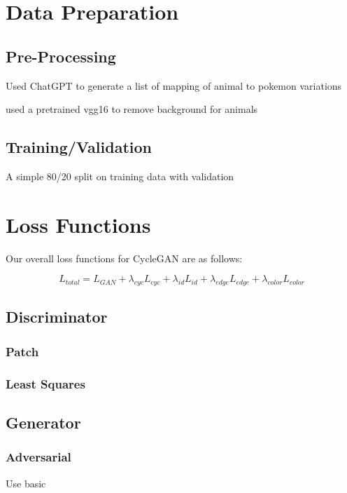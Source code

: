 \documentclass[twoside,english,notitlepage]{report}
\begin{document}
\section{Data Preparation}
\subsection{Pre-Processing}
Used ChatGPT to generate a list of mapping of animal to pokemon variations


used a pretrained vgg16 to remove background for animals



\subsection{Training/Validation}
A simple 80/20 split on training data with validation



\section{Loss Functions}
Our overall loss functions for CycleGAN are as follows:


\begin{equation}
    L_{total} = L_{GAN} + \lambda_{cyc} L_{cyc} + \lambda_{id} L_{id} + \lambda_{edge} L_{edge} + \lambda_{color} L_{color}
\end{equation}

\subsection{Discriminator}
\subsubsection{Patch}

\subsubsection{Least Squares}

\subsection{Generator}

\subsubsection{Adversarial}
Use basic 
\end{document}
